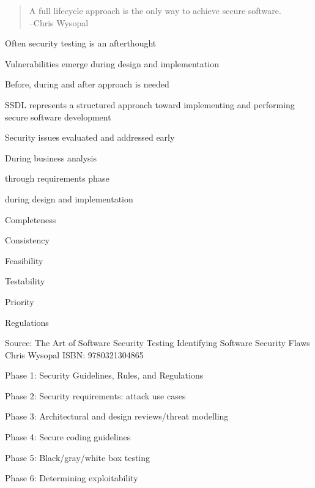 \documentclass[Screen16to9,17pt]{foils}
\begin{document}




\begin{quote}
  A full lifecycle approach is the only way to achieve secure software.\\
  --Chris Wysopal
\end{quote}

\begin{list2}
\item Often security testing is an afterthought
\item Vulnerabilities emerge during design and implementation
\item Before, during and after approach is needed
\end{list2}


\begin{list2}
\item SSDL represents a structured approach toward implementing and performing secure software development
\item Security issues evaluated and addressed early
\item During business analysis
\item through requirements phase
\item during design and implementation
\end{list2}


\begin{list2}
\item Completeness
\item Consistency
\item Feasibility
\item Testability
\item Priority
\item Regulations
\end{list2}

Source: The Art of Software Security Testing Identifying Software Security Flaws
Chris Wysopal ISBN: 9780321304865


\begin{list2}
\item Phase 1: Security Guidelines, Rules, and Regulations
\item Phase 2: Security requirements: attack use cases
\item Phase 3: Architectural and design reviews/threat modelling
\item Phase 4: Secure coding guidelines
\item Phase 5: Black/gray/white box testing
\item Phase 6: Determining exploitability
\end{list2}
\end{document}
